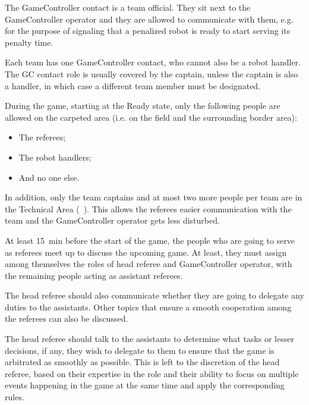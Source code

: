 
The GameController contact is a team official. They sit next to the GameController operator and they are allowed to communicate with them, e.g. for the purpose of signaling that a penalized robot is ready to start serving its penalty time.

Each team has one GameController contact, who cannot also be a robot handler. The GC contact role is usually covered by the captain, unless the captain is also a handler, in which case a different team member must be designated.



During the game, starting at the Ready state, only the following people are allowed on the carpeted area (i.e. on the field and the surrounding border area):

\begin{itemize}
    \item The referees;
    \item The robot handlers;
    \item And no one else.
\end{itemize}

In addition, only the team captains and at most two more people per team are in the Technical Area (\cf~).
This allows the referees easier communication with the team and the GameController operator gets less disturbed.


\label{sec:judgement}

\label{sec:referee_delegation}

At least \qty{15}{\minute} before the start of the game, the people who are going to serve as referees meet up to discuss the upcoming game. At least, they must assign among themselves the roles of head referee and GameController operator, with the remaining people acting as assistant referees.

The head referee should also communicate whether they are going to delegate any duties to the assistants. Other topics that ensure a smooth cooperation among the referees can also be discussed.

The head referee should talk to the assistants to determine what tasks or lesser decisions, if any, they wish to delegate to them to ensure that the game is arbitrated as smoothly as possible. This is left to the discretion of the head referee, based on their expertise in the role and their ability to focus on multiple events happening in the game at the same time and apply the corresponding rules.

